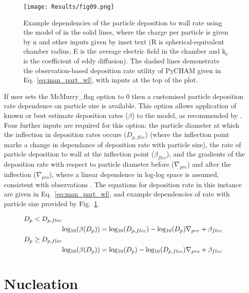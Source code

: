 \documentclass[gmd, manuscript]{copernicus}
\begin{document}
\begin{figure}[t]
\texttt{[image: Results/fig09.png]}
\caption{Example dependencies of the particle deposition to wall rate using the model of \citet{McMurry1985} in the solid lines, where the charge per particle is given by n and other inputs given by inset text (R is spherical-equivalent chamber radius, E is the average electric field in the chamber and $\mathrm{k_e}$ is the coefficient of eddy diffusion).  The dashed lines demonstrate the observation-based deposition rate utility of PyCHAM given in Eq.~\ref{eq:man_part_wl}, with inputs at the top of the plot.}
\label{fig:part_wall_depo_plot}
\end{figure}

If user sets the McMurry\_flag option to 0 then a customised particle deposition rate dependence on particle size is available.  This option allows application of known or best estimate deposition rates ($\beta$) to the model, as recommended by \citet{Wang2018}.  Four further inputs are required for this option: the particle diameter at which the inflection in deposition rates occurs ($D_{p,flec}$) (where the inflection point marks a change in dependance of deposition rate with particle size), the rate of particle deposition to wall at the inflection point ($\beta_{flec}$), and the gradients of the deposition rate with respect to particle diameter before ($\nabla_{pre}$) and after the inflection ($\nabla_{pro}$), where a linear dependence in log-log space is assumed, consistent with observations \citep{Charan2019}.  The equations for deposition rate in this instance are given in Eq.~\ref{eq:man_part_wl}, and example dependencies of rate with particle size provided by Fig.~\ref{fig:part_wall_depo_plot}.

\begin{align} \label{eq:man_part_wl}
D_{p}<D_{p,flec} \nonumber \\
&\rm{log_{10}}(\mit{\beta(D_{p}})) = \rm{log_{10}}(\mit{D_{p,flec}})-\rm{log_{10}}\mit{(D_{p})}\nabla_{pre}+\beta_{flec} \nonumber \\
D_{p}\geq D_{p,flec} \nonumber \\
&\rm{log_{10}}(\mit{\beta(D_{p}})) = \rm{log_{10}}(\mit{D_{p}})-\rm{log_{10}}\mit{(D_{p,flec})}\nabla_{pro}+\beta_{flec}
\end{align}



\section{Nucleation}\label{sec:nuc}
\end{document}
